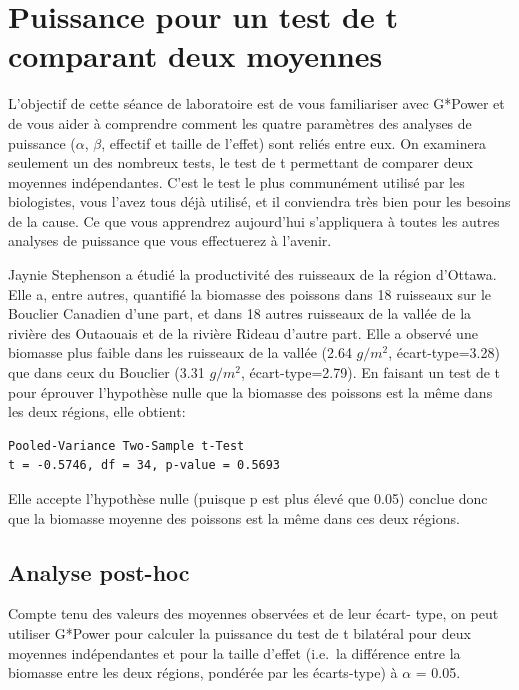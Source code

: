 \documentclass[
  12pt,
]{book}
\begin{document}
\hypertarget{puissance-pour-un-test-de-t-comparant-deux-moyennes}{%
\section{Puissance pour un test de t comparant deux moyennes}\label{puissance-pour-un-test-de-t-comparant-deux-moyennes}}

L'objectif de cette séance de laboratoire est de vous familiariser avec G*Power et de vous aider à comprendre comment les quatre paramètres des analyses de puissance (\(\alpha\), \(\beta\), effectif et taille de l'effet) sont reliés entre eux.
On examinera seulement un des nombreux tests, le test de t permettant de comparer deux moyennes indépendantes.
C'est le test le plus communément utilisé par les biologistes, vous l'avez tous déjà utilisé, et il conviendra très bien pour les besoins de la cause.
Ce que vous apprendrez aujourd'hui s'appliquera à toutes les autres analyses de puissance que vous effectuerez à l'avenir.

Jaynie Stephenson a étudié la productivité des ruisseaux de la région d'Ottawa.
Elle a, entre autres, quantifié la biomasse des poissons dans 18 ruisseaux sur le Bouclier Canadien d'une part, et dans 18 autres ruisseaux de la vallée de la rivière des Outaouais et de la rivière Rideau d'autre part.
Elle a observé une biomasse plus faible dans les ruisseaux de la vallée (2.64 \(g/m^2\), écart-type=3.28) que dans ceux du Bouclier (3.31 \(g/m^2\), écart-type=2.79).
En faisant un test de t pour éprouver l'hypothèse nulle que la biomasse des poissons est la même dans les deux régions, elle obtient:

\begin{verbatim}
Pooled-Variance Two-Sample t-Test
t = -0.5746, df = 34, p-value = 0.5693
\end{verbatim}

Elle accepte l'hypothèse nulle (puisque p est plus élevé que 0.05) conclue donc que la biomasse moyenne des poissons est la même dans ces deux régions.

\hypertarget{analyse-post-hoc}{%
\subsection{Analyse post-hoc}\label{analyse-post-hoc}}

Compte tenu des valeurs des moyennes observées et de leur écart- type, on peut utiliser G*Power pour calculer la puissance du test de t bilatéral pour deux moyennes indépendantes et pour la taille d'effet (i.e.~la différence entre la biomasse entre les deux régions, pondérée par les écarts-type) à \(\alpha\) = 0.05.
\end{document}
